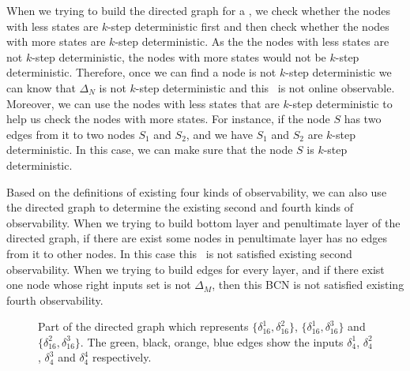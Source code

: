 When we trying to build the directed graph for a \BCN, we check whether the nodes with less states are $k$-step deterministic first and then check whether the nodes with more states are $k$-step deterministic.  As the the nodes with less states are not $k$-step deterministic, the nodes with more states would not be $k$-step deterministic. Therefore, once we can find a node is not $k$-step deterministic we can know that $\Delta_N$ is not $k$-step deterministic and this \BCN\ is not online observable. Moreover, we can use the nodes with less states that are $k$-step deterministic to help us check the nodes with more states. For instance, if the node $S$ has two edges from it to two nodes $S_1$ and $S_2$, and we have $S_1$ and $S_2$ are $k$-step deterministic. In this case, we can make sure that the node $S$ is $k$-step deterministic.

Based on the definitions of existing four kinds of observability, we can also use the directed graph to determine the existing second and fourth kinds of observability. When we trying to build bottom layer and penultimate layer of the directed graph, if there are exist some nodes in penultimate layer has no edges from it to other nodes. In this case this \BCN\ is not satisfied existing second observability. When we trying to build edges for every layer, and if there exist one node whose right inputs set is not $\Delta_M$, then this BCN is not satisfied existing fourth observability.
\begin{figure}[thpb]
      \centering
      
      \caption{Part of the directed graph which represents $\{\delta_{16}^1,\delta_{16}^2\}$, $\{\delta_{16}^1,\delta_{16}^3\}$ and $\{\delta_{16}^2,\delta_{16}^3\}$. The green, black, orange, blue edges show the inputs $\delta_4^1$, $\delta_4^2$, $\delta_4^3$ and $\delta_4^4$ respectively.}
      \label{fig:4}
   \end{figure}
